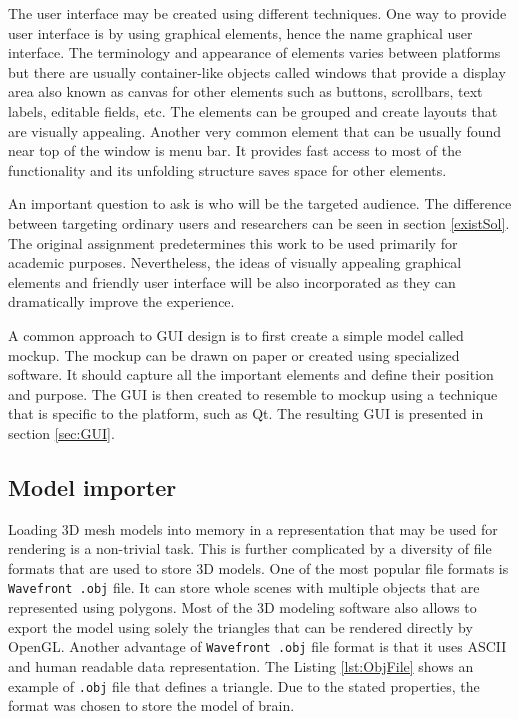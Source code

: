 The user interface may be created using different techniques. One way to provide user interface is by using graphical elements, hence the name graphical user interface. The terminology and appearance of elements varies between platforms but there are usually container-like objects called windows that provide a display area also known as canvas for other elements such as buttons, scrollbars, text labels, editable fields, etc. The elements can be grouped and create layouts that are visually appealing. Another very common element that can be usually found near top of the window is menu bar. It provides fast access to most of the functionality and its unfolding structure saves space for other elements. 

An important question to ask is who will be the targeted audience. The difference between targeting ordinary users and researchers can be seen in section \ref{existSol}. The original assignment predetermines this work to be used primarily for academic purposes. Nevertheless, the ideas of visually appealing graphical elements and friendly user interface will be also incorporated as they can dramatically improve the experience.

A common approach to GUI design is to first create a simple model called mockup. The mockup can be drawn on paper or created using specialized software. It should capture all the important elements and define their position and purpose. The GUI is then created to resemble to mockup using a technique that is specific to the platform, such as Qt. The resulting GUI is presented in section \ref{sec:GUI}. 

\subsection{Model importer}
Loading 3D mesh models into memory in a representation that may be used for rendering is a non-trivial task. This is further complicated by a diversity of file formats that are used to store 3D models. One of the most popular file formats is \texttt{Wavefront .obj} file. It can store whole scenes with multiple objects that are represented using polygons. Most of the 3D modeling software also allows to export the model using solely the triangles that can be rendered directly by OpenGL. Another advantage of \texttt{Wavefront .obj} file format is that it uses ASCII and human readable data representation. The Listing \ref{lst:ObjFile} shows an example of \texttt{.obj} file that defines a triangle. Due to the stated properties, the format was chosen to store the model of brain.

